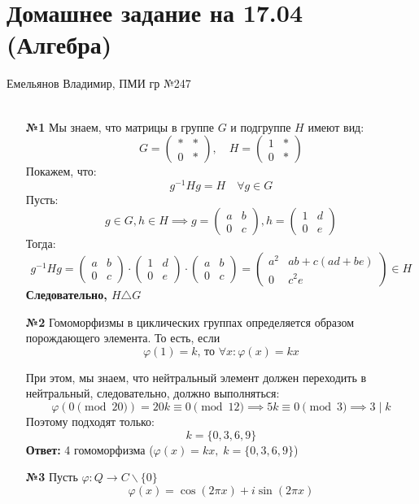 \documentclass[a4paper]{article}
\newcommand{\mat}[1]{\begin{pmatrix} #1 \end{pmatrix}}
\renewcommand{\phi}{\varphi}
\newcommand{\divides}{\;|\;}
\begin{document}
\section*{Домашнее задание на 17.04 (Алгебра)}
 {\large Емельянов Владимир, ПМИ гр №247}\\\\
\begin{enumerate}
    \item[\textbf{№1}]Мы знаем, что матрицы в группе $G$ и подгруппе $H$ имеют вид:
    $$G = \mat{* & * \\0 & *}, \quad H = \mat{1 & * \\0 & *}$$
    Покажем, что:
    $$g^{-1}Hg = H \quad \forall g \in G$$
    Пусть:
    $$g \in G, h \in H \implies g = \mat{a & b\\0 & c}, h = \mat{1 & d \\ 0 & e}$$
    Тогда:
    $$g^{-1}Hg = \mat{a & b\\0 & c} \cdot \mat{1 & d \\ 0 & e} \cdot  \mat{a & b\\0 & c}  = \begin{pmatrix}
        a^2 & ab + c(ad + be) \\
        0 & c^2e
        \end{pmatrix}  \in H$$
    \textbf{Следовательно, $H \triangle G$}

    \item[\textbf{№2}]Гомоморфизмы в циклических группах определяется образом порождающего элемента. 
    То есть, если $$\text{$\phi(1) = k$, то $\forall x: \phi(x) = kx$}$$

    При этом, мы знаем, что нейтральный элемент должен переходить в нейтральный,
     следовательно, должно выполняться:
    $$\phi(0 \pmod{20}) = 20k \equiv 0 \pmod{12} \implies 5k \equiv 0 \pmod{3} \implies 3 \divides k $$
    Поэтому подходят только:
    $$k = \{0, 3, 6, 9\}$$
    \textbf{Ответ: } 4 гомоморфизма ($\phi(x) = kx, \;k = \{0, 3, 6, 9\}$)\\

    \item[\textbf{№3}]Пусть $\phi: Q \to C\backslash \{0\}$
    $$\phi(x) = \cos(2\pi x) + i \sin(2\pi x)$$
    

\end{enumerate}
\end{document}
